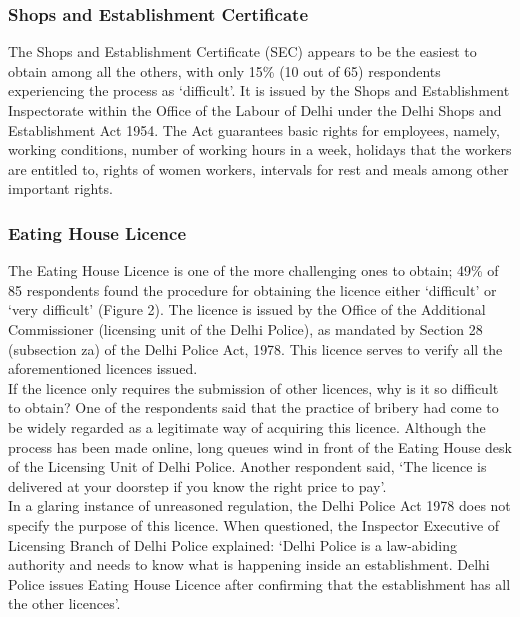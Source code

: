 \documentclass[a4paper, 12pt]{article}
\begin{document}
                   \subsubsection{Shops and Establishment Certificate}
                   The Shops and Establishment Certificate (SEC) appears to be the easiest to obtain among all the others, with only 15\% (10 out of 65) respondents experiencing the process as ‘difficult’. It is issued by the Shops and Establishment Inspectorate within the Office of the Labour of Delhi under the Delhi Shops and Establishment Act 1954. The Act guarantees basic rights for employees, namely, working conditions, number of working hours in a week, holidays that the workers are entitled to, rights of women workers, intervals for rest and meals among other important rights.
         
         
                   \subsubsection{Eating House Licence}
                   The Eating House Licence is one of the more challenging ones to obtain; 49\% of 85 respondents found the procedure for obtaining the licence either ‘difficult’ or ‘very difficult’ (Figure 2). The licence is issued by the Office of the Additional Commissioner (licensing unit of the Delhi Police), as mandated by Section 28 (subsection za) of the Delhi Police Act, 1978. This licence serves to verify all the aforementioned licences issued.\\
                   
                   If the licence only requires the submission of other licences, why is it so difficult to obtain? One of the respondents said that the practice of bribery had come to be widely regarded as a legitimate way of acquiring this licence. Although the process has 
been made online, long queues wind in front of the Eating House desk of the Licensing Unit of Delhi Police. Another respondent said, ‘The licence is delivered at your doorstep if you know the right price to pay’.\\
                   
                   In a glaring instance of unreasoned regulation, the Delhi Police Act 1978 does not specify the purpose of this licence. When questioned, the Inspector Executive of Licensing Branch of Delhi Police explained: ‘Delhi Police is a law-abiding authority and 
needs to know what is happening inside an establishment. Delhi Police issues Eating House Licence after confirming that the establishment has all the other licences’.\\
                   
\end{document}
